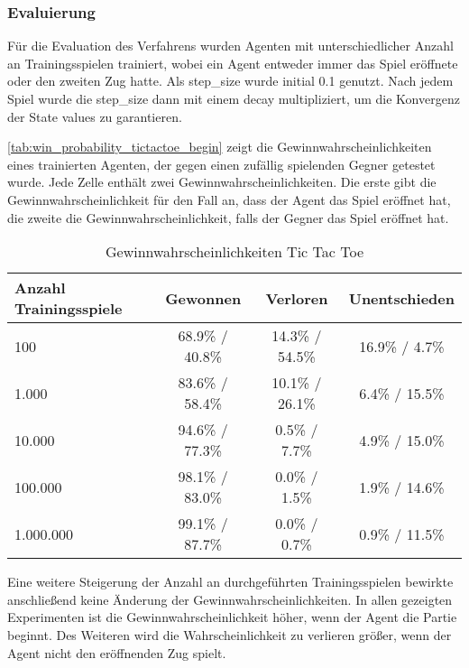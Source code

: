 \documentclass[11pt]{scrartcl}
\begin{document}
\subsubsection{Evaluierung}
Für die Evaluation des Verfahrens wurden Agenten mit unterschiedlicher Anzahl an
Trainingsspielen trainiert, wobei ein Agent entweder immer das Spiel eröffnete oder
den zweiten Zug hatte. Als step\_size wurde initial 0.1 genutzt. Nach jedem Spiel wurde
die step\_size dann mit einem decay multipliziert, um die Konvergenz der State values
zu garantieren.

\autoref{tab:win_probability_tictactoe_begin} zeigt die Gewinnwahrscheinlichkeiten eines
trainierten Agenten, der gegen einen zufällig spielenden Gegner getestet wurde. Jede Zelle
enthält zwei Gewinnwahrscheinlichkeiten. Die erste gibt die Gewinnwahrscheinlichkeit für
den Fall an, dass der Agent das Spiel eröffnet hat, die zweite die
Gewinnwahrscheinlichkeit, falls der Gegner das Spiel eröffnet hat.
\begin{table}[ht]
  \begin{center}
    \begin{tabular}{l | c | c | c}
      Anzahl Trainingsspiele & Gewonnen & Verloren & Unentschieden \\
      \hline
      100 & 68.9\% / 40.8\% & 14.3\% / 54.5\% & 16.9\% / 4.7\% \\
      1.000 & 83.6\% / 58.4\% & 10.1\% / 26.1\% & 6.4\% / 15.5\% \\
      10.000 & 94.6\% / 77.3\% & 0.5\% / 7.7\% & 4.9\% / 15.0\% \\
      100.000 & 98.1\% / 83.0\% & 0.0\% / 1.5\% & 1.9\% / 14.6\% \\
      1.000.000 & 99.1\% / 87.7\% & 0.0\% / 0.7\% & 0.9\% / 11.5\% \\
    \end{tabular}

    \caption[Gewinnwahrscheinlichkeiten Tic-Tac-Toe]{Gewinnwahrscheinlichkeiten Tic Tac
    Toe}
    \label{tab:win_probability_tictactoe_begin}
  \end{center}
\end{table}

\noindent
Eine weitere Steigerung der Anzahl an durchgeführten Trainingsspielen bewirkte
anschließend keine Änderung der Gewinnwahrscheinlichkeiten. In allen gezeigten
Experimenten ist die Gewinnwahrscheinlichkeit höher, wenn der Agent die Partie beginnt.
Des Weiteren wird die Wahrscheinlichkeit zu verlieren größer, wenn der Agent nicht den
eröffnenden Zug spielt.
\end{document}
